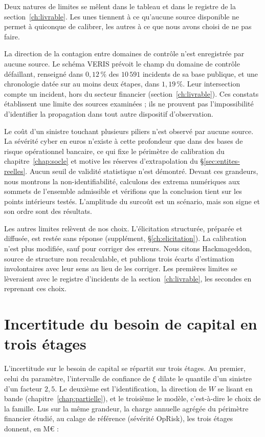 
Deux natures de limites se mêlent dans le tableau et dans le registre de la section~\ref{ch:livrable}.
Les unes tiennent à ce qu'aucune source disponible ne permet à quiconque de calibrer, les autres à ce
que nous avons choisi de ne pas faire.

La direction de la contagion entre domaines de contrôle n'est enregistrée par aucune source. Le
schéma VERIS prévoit le champ du domaine de contrôle défaillant, renseigné dans $0{,}12\,\%$ des
$10\,591$ incidents de sa base publique, et une chronologie datée sur au moins deux étapes, dans
$1{,}19\,\%$. Leur intersection
compte un incident, hors du secteur financier (section~\ref{ch:livrable}). Ces constats établissent une limite des sources examinées ; ils ne prouvent pas l'impossibilité d'identifier la propagation dans tout autre dispositif d'observation.

Le coût d'un sinistre touchant plusieurs piliers n'est observé par aucune source. La sévérité cyber
en euros n'existe à cette profondeur que dans des bases de risque opérationnel bancaire, ce qui
fixe le périmètre de calibration du chapitre~\ref{chap:socle} et motive les réserves d'extrapolation du \S\ref{sec:entites-reelles}. Aucun seuil de validité statistique n'est démontré. Devant ces grandeurs, nous montrons la
non-identifiabilité, calculons des extrema numériques aux sommets de l'ensemble admissible et vérifions que la
conclusion tient sur les points intérieurs testés. L'amplitude du surcoût est un scénario, mais son signe et son ordre sont
des résultats.

Les autres limites relèvent de nos choix. L'élicitation structurée, préparée et diffusée, est restée
sans réponse (supplément, \S\ref{ch:elicitation}). La calibration n'est plus modifiée, sauf pour
corriger des erreurs. Nous citons Hackmageddon, source de structure non recalculable, et publions trois écarts
d'estimation involontaires avec leur sens au lieu de les corriger. Les premières limites se
lèveraient avec le registre d'incidents de la section~\ref{ch:livrable}, les secondes en reprenant
ces choix.

\section{Incertitude du besoin de capital en trois étages}
\label{sec:trois-etages}
\label{sec:etage-modele-hors-bande}

L'incertitude sur le besoin de capital se répartit sur trois étages. Au premier, celui du paramètre, l'intervalle
de confiance de $\xi$ dilate le quantile d'un sinistre d'un facteur $2{,}5$. Le deuxième est
l'identification, la direction de $W$ se lisant en bande (chapitre~\ref{chap:partielle}), et le
troisième le modèle, c'est-à-dire le choix de la famille. Lus sur la même grandeur, la charge annuelle
agrégée du périmètre financier étudié, au calage de référence (sévérité OpRisk), les trois étages donnent, en M\euro{} :

